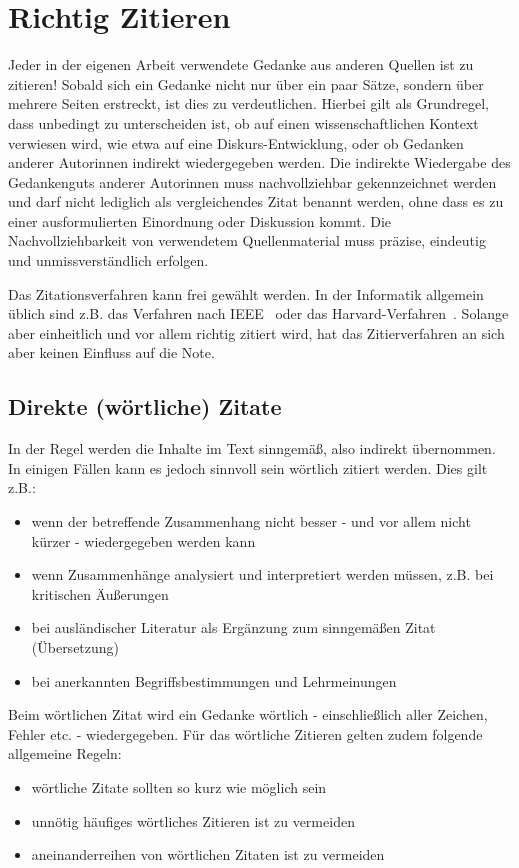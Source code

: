 \section{Richtig Zitieren}\label{sec:citations}
%
Jeder in der eigenen Arbeit verwendete Gedanke aus anderen Quellen ist zu zitieren! Sobald sich ein Gedanke nicht nur über ein paar Sätze, sondern über mehrere Seiten erstreckt, ist dies zu verdeutlichen. Hierbei gilt als Grundregel, dass unbedingt zu unterscheiden ist, ob auf einen wissenschaftlichen Kontext verwiesen wird, wie etwa auf eine Diskurs-Entwicklung, oder ob Gedanken anderer Autorinnen indirekt wiedergegeben werden. Die indirekte Wiedergabe des Gedankenguts anderer Autorinnen muss nachvollziehbar gekennzeichnet werden und darf nicht lediglich als vergleichendes Zitat benannt werden, ohne dass es zu einer ausformulierten Einordnung oder Diskussion kommt. Die Nachvollziehbarkeit von verwendetem Quellenmaterial muss präzise, eindeutig und unmissverständlich erfolgen.

Das Zitationsverfahren kann frei gewählt werden. In der Informatik allgemein üblich sind z.B. das Verfahren nach IEEE~\cite{wikipedia:citing_ieee} oder das Harvard-Verfahren~\cite{wikipedia:citing_harvard}. Solange aber einheitlich und vor allem richtig zitiert wird, hat das Zitierverfahren an sich aber keinen Einfluss auf die Note.

\subsection{Direkte (wörtliche) Zitate}\label{sec:citations:direct}
%
In der Regel werden die Inhalte im Text sinngemäß, also indirekt übernommen. In einigen Fällen kann es jedoch sinnvoll sein wörtlich zitiert werden. Dies gilt z.B.:
%
\begin{itemize}
  \item wenn der betreffende Zusammenhang nicht besser - und vor allem nicht kürzer - wiedergegeben werden kann
  \item wenn Zusammenhänge analysiert und interpretiert werden müssen, z.B. bei kritischen Äußerungen
  \item bei ausländischer Literatur als Ergänzung zum sinngemäßen Zitat (Übersetzung)
  \item bei anerkannten Begriffsbestimmungen und Lehrmeinungen
\end{itemize}
\smallskip

Beim wörtlichen Zitat wird ein Gedanke wörtlich - einschließlich aller Zeichen, Fehler etc. -
wiedergegeben. Für das wörtliche Zitieren gelten zudem folgende allgemeine Regeln:
%
\begin{itemize}
  \item wörtliche Zitate sollten so kurz wie möglich sein
  \item unnötig häufiges wörtliches Zitieren ist zu vermeiden
  \item aneinanderreihen von wörtlichen Zitaten ist zu vermeiden
\end{itemize}
\smallskip

